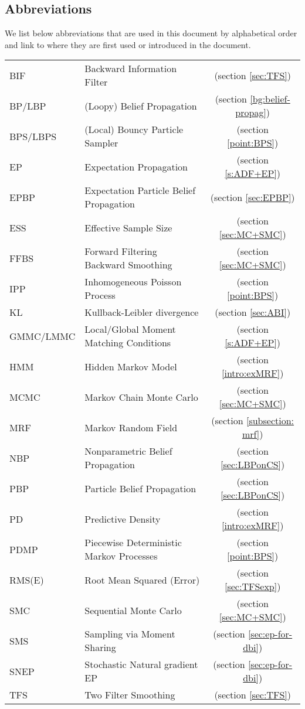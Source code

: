 \subsection*{Abbreviations}
We list below abbreviations that are used in this document by alphabetical order and link to where they are first used or introduced in the document.
\setlength{\tabcolsep}{12pt}
\renewcommand{\arraystretch}{1.2}
\begin{longtable}{llc}
BIF 			& Backward Information Filter &(section \ref{sec:TFS})\\
BP/LBP 		& (Loopy) Belief Propagation &(section \ref{bg:belief-propag})\\
BPS/LBPS 	& (Local) Bouncy Particle Sampler & (section \ref{point:BPS})\\
EP	 		& Expectation Propagation &(section \ref{s:ADF+EP})\\
EPBP 		& Expectation Particle Belief Propagation &(section \ref{sec:EPBP})\\
ESS 			& Effective Sample Size &(section \ref{sec:MC+SMC})\\
FFBS 		& Forward Filtering Backward Smoothing &(section \ref{sec:MC+SMC})\\
IPP 			& Inhomogeneous Poisson Process &(section \ref{point:BPS})\\
KL 			& Kullback-Leibler divergence & (section \ref{sec:ABI})\\
GMMC/LMMC	& Local/Global Moment Matching Conditions &(section \ref{s:ADF+EP})\\
HMM 		& Hidden Markov Model &(section \ref{intro:exMRF})\\
MCMC 		& Markov Chain Monte Carlo &(section \ref{sec:MC+SMC})\\
MRF 		& Markov Random Field &(section \ref{subsection: mrf})\\
NBP 			& Nonparametric Belief Propagation &(section \ref{sec:LBPonCS})\\
PBP	 		& Particle Belief Propagation &(section \ref{sec:LBPonCS})\\
PD 			& Predictive Density &(section \ref{intro:exMRF})\\
PDMP 		& Piecewise Deterministic Markov Processes & (section \ref{point:BPS})\\
RMS(E) 		& Root Mean Squared (Error) &(section \ref{sec:TFSexp})\\
SMC 		& Sequential Monte Carlo &(section \ref{sec:MC+SMC})\\
SMS 		& Sampling via Moment Sharing &(section \ref{sec:ep-for-dbi})\\
SNEP		& Stochastic Natural gradient EP &(section \ref{sec:ep-for-dbi})\\
TFS 			& Two Filter Smoothing &(section \ref{sec:TFS})\\ 
\end{longtable}
\setlength{\tabcolsep}{6pt} %

